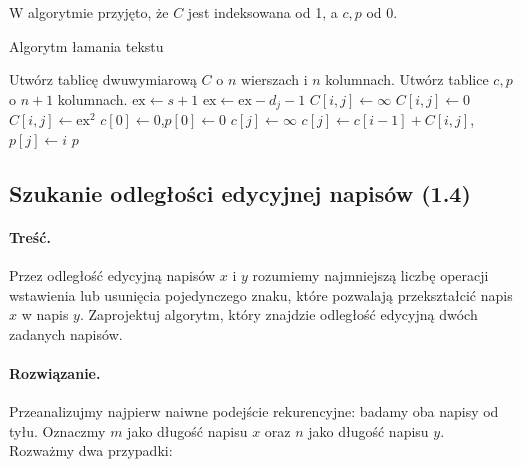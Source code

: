 W algorytmie przyjęto, że $C$ jest indeksowana od 1, a $c,p$ od 0.
\begin{algorithm}[H]
	\caption{Algorytm łamania tekstu}\label{Zadanie13}

	\begin{algorithmic}[1]
			\State Utwórz tablicę dwuwymiarową $C$ o $n$ wierszach i $n$ kolumnach.
			\State Utwórz tablice $c,p$ o $n+1$ kolumnach.
				\State $\textrm{ex}\gets s+1$
					\State $\textrm{ex}\gets \textrm{ex} - d_j - 1$
						\State $C[i,j]\gets\infty$
						\State $C[i,j]\gets0$
					\Else
						\State $C[i,j]\gets\textrm{ex}^2$
					\EndIf
				\EndFor
			\EndFor
			\State $c[0]\gets0$,\quad$p[0]\gets0$
				\State $c[j]\gets\infty$
						\State $c[j]\gets c[i-1]+C[i,j]$,\qquad$p[j]\gets i$
					\EndIf
				\EndFor
			\EndFor
			\State \Return $p$
		\EndProcedure
	\end{algorithmic}
\end{algorithm}

\subsection{Szukanie odległości edycyjnej napisów (1.4)}
\paragraph{Treść.} Przez odległość edycyjną napisów 
$x$ i $y$ rozumiemy najmniejszą liczbę operacji wstawienia lub usunięcia
pojedynczego znaku, które pozwalają przekształcić napis $x$ w napis $y$.
Zaprojektuj algorytm, który znajdzie odległość 
edycyjną dwóch zadanych napisów.
\paragraph{Rozwiązanie.}
Przeanalizujmy najpierw naiwne podejście rekurencyjne: badamy 
oba napisy od tyłu. Oznaczmy $m$ jako długość napisu $x$
oraz $n$ jako długość napisu $y$. Rozważmy dwa przypadki: 

